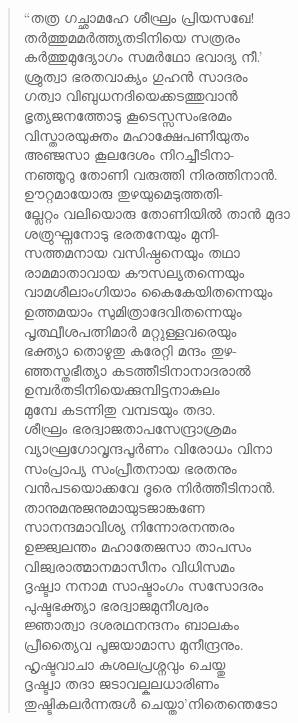 \begin{verse}
“തത്ര ഗച്ഛാമഹേ ശീഘ്രം പ്രിയസഖേ!\\
തര്‍ത്തുമമര്‍ത്ത്യതടിനിയെ സത്രരം\\
കര്‍ത്തുമുദ്യോഗം സമര്‍ഥോ ഭവാദ്യ നീ.’\\
ശ്രുത്വാ ഭരതവാക്യം ഗുഹന്‍ സാദരം\\
ഗത്വാ വിബുധനദിയെക്കടത്തുവാന്‍\\
ഭൃത്യജനത്തോടു കൂടെസ്സസംഭരമം\\
വിസ്താരയുക്തം മഹാക്ഷേപണീയുതം\\
അഞ്ജസാ കൂലദേശം നിറച്ചീടിനാ-\\
നഞ്ഞൂറു തോണി വരുത്തി നിരത്തിനാന്‍.\\
ഊറ്റമായോരു തുഴയുമെടുത്തതി-\\
ല്ലേറ്റം വലിയൊരു തോണിയില്‍ താന്‍ മുദാ\\
ശത്രുഘ്നനോടു ഭരതനേയും മുനി-\\
സത്തമനായ വസിഷ്ഠനെയും തഥാ\\
രാമമാതാവായ കൗസല്യതന്നെയും\\
വാമശീലാംഗിയാം കൈകേയിതന്നെയും\\
ഉത്തമയാം സുമിത്രാദേവിതന്നെയും\\
പൃത്ഥ്വീശപത്നിമാര്‍ മറ്റുള്ളവരെയും\\
ഭക്ത്യാ തൊഴുതു കരേറ്റി മന്ദം തുഴ-\\
ഞ്ഞസ്തഭീത്യാ കടത്തീടിനാനാദരാല്‍\\
ഉമ്പര്‍തടിനിയെക്കുമ്പിട്ടനാകുലം\\
മുമ്പേ കടന്നിതു വമ്പടയും തദാ.\\
ശീഘ്രം ഭരദ്വാജതാപസേന്ദ്രാശ്രമം\\
വ്യാഘ്രഗോവൃന്ദപൂര്‍ണം വിരോധം വിനാ\\
സംപ്രാപ്യ സംപ്രീതനായ ഭരതനും\\
വന്‍പടയൊക്കവേ ദൂരെ നിര്‍ത്തീടിനാന്‍.\\
താനുമനുജനുമായുടജാങ്കണേ\\
സാനന്ദമാവിശ്യ നിന്നോരനന്തരം\\
ഉജ്ജ്വലന്തം മഹാതേജസാ താപസം\\
വിജ്വരാത്മാനമാസീനം വിധിസമം\\
ദൃഷ്ട്വാ നനാമ സാഷ്ടാംഗം സസോദരം\\
പുഷ്ടഭക്ത്യാ ഭരദ്വാജമുനീശ്വരം\\
ജ്ഞാത്വാ ദശരഥനന്ദനം ബാലകം\\
പ്രീത്യൈവ പൂജയാമാസ മുനീന്ദ്രനും.\\
ഹൃഷ്ടവാചാ കുശലപ്രശ്നവും ചെയ്തു\\
ദൃഷ്ട്വാ തദാ ജടാവല്കലധാരിണം\\
തുഷ്ടികലര്‍ന്നരുള്‍ ചെയ്താ’നിതെന്തെടോ\\

\end{verse}
